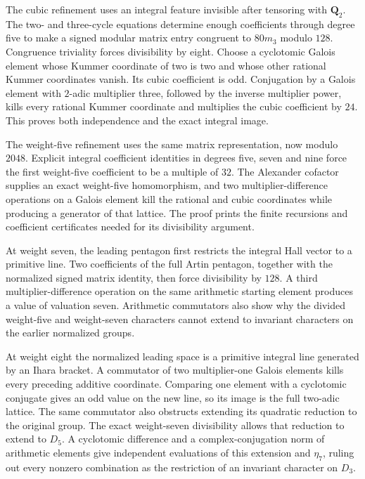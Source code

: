 \documentclass[11pt,a4paper]{article}
\theoremstyle{definition}
\theoremstyle{remark}
\newcommand{\Q}{\mathbf Q}
\begin{document}
The cubic refinement uses an integral feature invisible after tensoring
with $\Q_2$.  The two- and three-cycle equations determine enough
coefficients through degree five to make a signed modular matrix entry
congruent to $80m_3$ modulo $128$.  Congruence triviality forces divisibility
by eight.  Choose a cyclotomic Galois element whose Kummer coordinate of two
is two and whose other rational Kummer coordinates vanish.  Its cubic
coefficient is odd.  Conjugation by a Galois element with $2$-adic
multiplier three, followed by the inverse multiplier power, kills every
rational Kummer coordinate and multiplies the cubic coefficient by $24$.  This proves both independence and the exact integral image.

The weight-five refinement uses the same matrix representation, now
modulo $2048$.  Explicit integral coefficient identities in degrees
five, seven and nine force the first weight-five coefficient to be a
multiple of $32$.  The Alexander cofactor supplies an exact weight-five
homomorphism, and two multiplier-difference operations on a Galois
element kill the rational and cubic coordinates while producing a
generator of that lattice.  The proof prints the finite recursions and
coefficient certificates needed for its divisibility argument.

At weight seven, the leading pentagon first restricts the integral
Hall vector to a primitive line. Two coefficients of the full Artin
pentagon, together with the normalized signed matrix identity, then
force divisibility by $128$. A third multiplier-difference operation
on the same arithmetic starting element produces a value of valuation
seven. Arithmetic commutators also show why the divided weight-five
and weight-seven characters cannot extend to invariant characters on
the earlier normalized groups.

At weight eight the normalized leading space is a primitive integral
line generated by an Ihara bracket. A commutator of two multiplier-one
Galois elements kills every preceding additive coordinate. Comparing
one element with a cyclotomic conjugate gives an odd value on the new
line, so its image is the full two-adic lattice. The same commutator
also obstructs extending its quadratic reduction to the original group.
The exact weight-seven divisibility allows that reduction to extend to
$D_5$. A cyclotomic difference and a complex-conjugation norm of arithmetic
elements give independent evaluations of this extension and $\eta_7$,
ruling out every nonzero combination as the restriction of an invariant
character on $D_3$.
\end{document}
